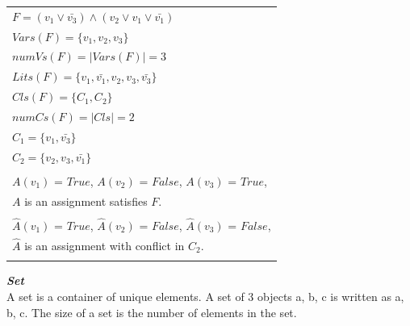 \documentclass[12pt,a4paper,twoside]{scrartcl}
\numberwithin{equation}{section}
\begin{document}
\begin{center}
\begin{table}
\begin{tabular}{l}
$F = (v_1 \lor \bar{v_3}) \land (v_2 \lor v_1 \lor \bar{v_1})$\\	
$Vars(F) = \{v_1, v_2, v_3\}$\\
$numVs(F) = |Vars(F)| = 3$\\
$Lits(F) = \{v_1, \bar{v_1}, v_2, v_3, \bar{v_3}\}$\\
$Cls(F) = \{C_1, C_2\}$\\
$numCs(F) = |Cls| = 2$\\ 
$C_1 = \{v_1, \bar{v_3}\}$\\
$C_2 = \{v_2, v_3, \bar{v_1}\}$\\
\\
$A(v_1)$ = $True$, $A(v_2)$ = $False$, $A(v_3)$ = $True$, \\
$A$  is an assignment satisfies $F$.\\
\\
$\hat{A}(v_1)$ = $True$, $\hat{A}(v_2)$ = $False$, $\hat{A}(v_3)$ = $False$, \\
$\hat{A}$  is an assignment with conflict in $C_2$.\\
\\
\end{tabular}
\label{table:kysymys}
\end{table}
\end{center}




\emph{\textbf{Set}}\\
A set is a container of unique elements. A set of 3 objects a, b, c is written as {a, b, c}. The
size of a set is the number of elements in the set.
\end{document}
